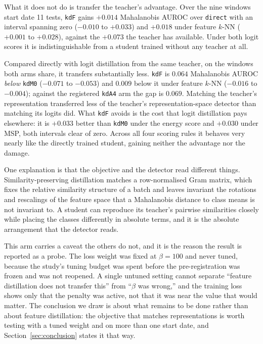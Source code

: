 \documentclass[journal]{IEEEtran}
\newcommand{\kd}[1]{\texttt{#1}}
\begin{document}
What it does not do is transfer the teacher's advantage. Over the nine windows start date 11 tests, \kd{kdF} gains $+0.014$ Mahalanobis AUROC over \kd{direct} with an interval spanning zero ($-0.010$ to $+0.033$) and $+0.018$ under feature $k$-NN ($+0.001$ to $+0.028$), against the $+0.073$ the teacher has available. Under both logit scores it is indistinguishable from a student trained without any teacher at all.

Compared directly with logit distillation from the same teacher, on the windows both arms share, it transfers substantially less. \kd{kdF} is $0.064$ Mahalanobis AUROC \emph{below} \kd{kdM0} ($-0.071$ to $-0.053$) and $0.009$ below it under feature $k$-NN ($-0.016$ to $-0.004$); against the registered \kd{kdA4} arm the gap is $0.069$. Matching the teacher's representation transferred less of the teacher's representation-space detector than matching its logits did. What \kd{kdF} avoids is the cost that logit distillation pays elsewhere: it is $+0.033$ better than \kd{kdM0} under the energy score and $+0.030$ under MSP, both intervals clear of zero. Across all four scoring rules it behaves very nearly like the directly trained student, gaining neither the advantage nor the damage.

One explanation is that the objective and the detector read different things. Similarity-preserving distillation matches a row-normalised Gram matrix, which fixes the relative similarity structure of a batch and leaves invariant the rotations and rescalings of the feature space that a Mahalanobis distance to class means is not invariant to. A student can reproduce its teacher's pairwise similarities closely while placing the classes differently in absolute terms, and it is the absolute arrangement that the detector reads.

This arm carries a caveat the others do not, and it is the reason the result is reported as a probe. The loss weight was fixed at $\beta = 100$ and never tuned, because the study's tuning budget was spent before the pre-registration was frozen and was not reopened. A single untuned setting cannot separate ``feature distillation does not transfer this'' from ``$\beta$ was wrong,'' and the training loss shows only that the penalty was active, not that it was near the value that would matter. The conclusion we draw is about what remains to be done rather than about feature distillation: the objective that matches representations is worth testing with a tuned weight and on more than one start date, and Section~\ref{sec:conclusion} states it that way.
\end{document}
